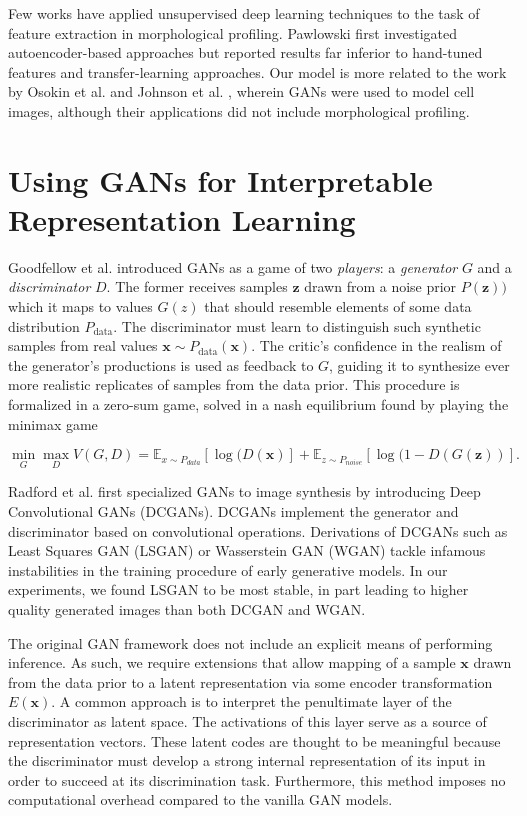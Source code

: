 \documentclass{article}
\begin{document}
Few works have applied unsupervised deep learning techniques to the task of
feature extraction in morphological profiling. Pawlowski \cite{pawlowski2016msc}
first investigated autoencoder-based approaches but reported results far
inferior to hand-tuned features and transfer-learning approaches. Our model is
more related to the work by Osokin et al. \cite{osokin2017gans} and Johnson et
al. \cite{johnson2017generative}, wherein GANs were used to model cell
images, although their applications did not include morphological profiling.

\section{Using GANs for Interpretable Representation Learning}

Goodfellow et al. \cite{goodfellow2014generative} introduced GANs as a game of
two \emph{players}: a \emph{generator} $G$ and a \emph{discriminator} $D$. The
former receives samples $\mathbf{z}$ drawn from a noise prior $P(\mathbf{z}))$
which it maps to values $G(z)$ that should resemble elements of some data
distribution $P_{\text{data}}$. The discriminator must learn to distinguish such
synthetic samples from real values $\mathbf{x} \sim
P_{\text{data}}(\mathbf{x})$. The critic's confidence in the realism of the
generator's productions is used as feedback to $G$, guiding it to synthesize
ever more realistic replicates of samples from the data prior. This procedure is
formalized in a zero-sum game, solved in a nash equilibrium found by playing the
minimax game

$$\min_G \max_D V(G, D) = \mathbb{E}_{x \sim P_{data}}[\log(D(\mathbf{x})] + \mathbb{E}_{z \sim P_{noise}}[\log(1 - D(G(\mathbf{z}))].$$

Radford et al. \cite{radford2015unsupervised} first specialized GANs to image
synthesis by introducing Deep Convolutional GANs (DCGANs). DCGANs implement the
generator and discriminator based on convolutional operations. Derivations of
DCGANs such as Least Squares GAN (LSGAN) \cite{mao2016least} or Wasserstein GAN
(WGAN) \cite{arjovsky2017wasserstein} tackle infamous instabilities in the
training procedure of early generative models. In our experiments, we found
LSGAN to be most stable, in part leading to higher quality generated images than
both DCGAN and WGAN.

The original GAN framework does not include an explicit means of performing
inference. As such, we require extensions that allow mapping of a sample
$\mathbf{x}$ drawn from the data prior to a latent representation via some
encoder transformation $E(\mathbf{x})$. A common approach is to interpret the
penultimate layer of the discriminator as latent space. The activations of this
layer serve as a source of representation vectors. These latent codes are
thought to be meaningful because the discriminator must develop a strong
internal representation of its input in order to succeed at its discrimination
task. Furthermore, this method imposes no computational overhead compared to the
vanilla GAN models.
\end{document}
